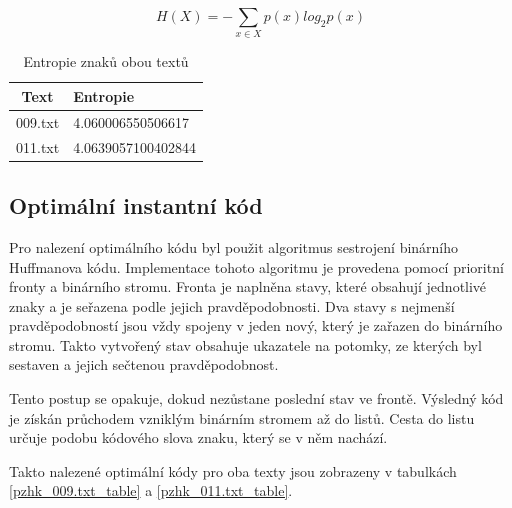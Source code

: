 \documentclass[12pt]{article}
\begin{document}
			$$ H(X) = -\sum_{x \displaystyle \in X} p(x) log_2 p(x)$$

\begin{table}[!ht]
\centering
\begin{tabular}{ | c | l | } \hline
Text	& Entropie \\ \hline
009.txt & 4.060006550506617 \\ \hline
011.txt & 4.0639057100402844 \\ \hline
\end{tabular}
\caption{Entropie znaků obou textů}
\label{ent_table}
\end{table}
			
			
			
			
		\subsection{Optimální instantní kód}\label{oik}
			Pro nalezení optimálního kódu byl použit algoritmus sestrojení binárního Huﬀmanova kódu. Implementace tohoto algoritmu je provedena pomocí prioritní fronty a binárního stromu. Fronta je naplněna stavy, které obsahují jednotlivé znaky a je seřazena podle jejich pravděpodobnosti. Dva stavy s nejmenší pravděpodobností jsou vždy spojeny v jeden nový, který je zařazen do binárního stromu. Takto vytvořený stav obsahuje ukazatele na potomky, ze kterých byl sestaven a jejich sečtenou pravděpodobnost. 
			
			Tento postup se opakuje, dokud nezůstane poslední stav ve frontě. Výsledný kód je získán průchodem vzniklým binárním stromem až do listů. Cesta do listu určuje podobu kódového slova znaku, který se v něm nachází.
			
			Takto nalezené optimální kódy pro oba texty jsou zobrazeny v tabulkách \ref{pzhk_009.txt_table} a \ref{pzhk_011.txt_table}.
			
\end{document}
